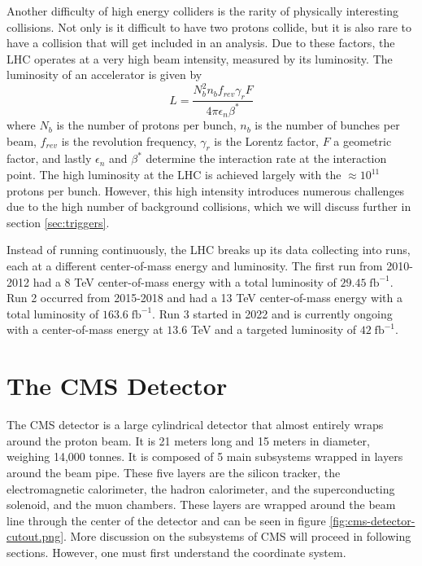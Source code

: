 Another difficulty of high energy colliders is the rarity of physically interesting collisions. Not only is it difficult to have two protons collide, but it is also rare to have a collision that will get included in an analysis. Due to these factors, the LHC operates at a very high beam intensity, measured by its luminosity. The luminosity of an accelerator is given by
\begin{equation}
    L = \frac{N_b^2n_b f_{rev} \gamma_r F}{4 \pi \epsilon_n \beta^*}
\label{eq:luminosity}
\end{equation}
where $N_b$ is the number of protons per bunch, $n_b$ is the number of bunches per beam, $f_{rev}$ is the revolution frequency, $\gamma_r$ is the Lorentz factor, $F$ a geometric factor, and lastly $\epsilon_n$ and $\beta^*$ determine the interaction rate at the interaction point. The high luminosity at the LHC is achieved largely with the $\approx 10^{11}$ protons per bunch. However, this high intensity introduces numerous challenges due to the high number of background collisions, which we will discuss further in section \ref{sec:triggers}.

Instead of running continuously, the LHC breaks up its data collecting into runs, each at a different center-of-mass energy and luminosity. The first run from 2010-2012 had a 8 TeV center-of-mass energy with a total luminosity of $29.45 \; \text{fb}^{-1}$. Run 2 occurred from 2015-2018 and had a 13 TeV center-of-mass energy with a total luminosity of $163.6 \; \text{fb}^{-1}$. Run 3 started in 2022 and is currently ongoing with a center-of-mass energy at $13.6$ TeV and a targeted luminosity of $42 \; \text{fb}^{-1}$. 

\section{The CMS Detector}

The CMS detector is a large cylindrical detector that almost entirely wraps around the proton beam. It is 21 meters long and 15 meters in diameter, weighing 14,000 tonnes. It is composed of 5 main subsystems wrapped in layers around the beam pipe. These five layers are the silicon tracker, the electromagnetic calorimeter, the hadron calorimeter, and the superconducting solenoid, and the muon chambers. These layers are wrapped around the beam line through the center of the detector and can be seen in figure \ref{fig:cms-detector-cutout.png}. More discussion on the subsystems of CMS will proceed in following sections. However, one must first understand the coordinate system.


